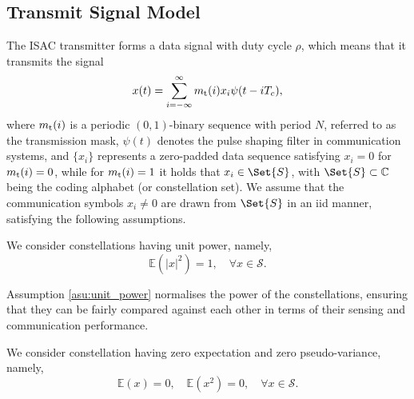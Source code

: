 \documentclass[journal,a4paper,10pt, romanappendices]{IEEEtran}
\begin{document}
\subsection{Transmit Signal Model}
The ISAC transmitter forms a data signal with duty cycle $\rho$, which means that it transmits the signal
\begin{equation}\label{transmit_model}
x(t)=\sum_{i=-\infty}^\infty m_{\rm t}(i)x_i\psi(t-iT_c), 
\end{equation}
where $m_{\rm t}(i)$ is a periodic $(0,1)$-binary sequence with period $N$, referred to as the transmission mask, $\psi(t)$ denotes the pulse shaping filter in communication systems, and $\{x_i\}$ represents a zero-padded data sequence satisfying $x_i=0$ for $m_{\rm t}(i)=0$, while for $m_{\rm t}(i)=1$ it holds that $x_i\in\Set{S}$, with $\Set{S}\subset \mathbb{C}$ being the coding alphabet (or constellation set). We assume that the communication symbols $x_i\neq 0$ are drawn from $\Set{S}$ in an \ac{iid} manner, satisfying the following assumptions.
\begin{assumption}\label{asu:unit_power}
    We consider constellations having unit power, namely, 
    \begin{equation}\label{unit_power}
        \mathbb{E}(|x|^2) = 1,\quad \forall x\in\mathcal{S}.
    \end{equation}
\end{assumption}
\noindent Assumption \ref{asu:unit_power} normalises the power of the constellations, ensuring that they can be fairly compared against each other in terms of their sensing and communication performance.
\begin{assumption}\label{asu:rotsym}
    We consider constellation having zero expectation and zero pseudo-variance, namely,
    \begin{equation}
        \mathbb{E}(x) = 0,\quad\mathbb{E}(x^2) = 0, \quad \forall x\in\mathcal{S}.
    \end{equation}
\end{assumption}
\end{document}
